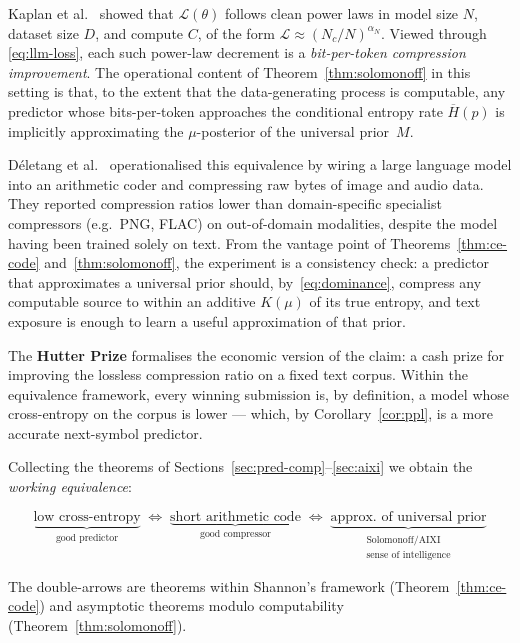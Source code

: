 Kaplan et al.\ \citep{kaplan2020scaling} showed that
$\mathcal{L}(\theta)$ follows clean power laws in model size $N$,
dataset size $D$, and compute $C$, of the form
$\mathcal{L} \approx (N_c / N)^{\alpha_N}$. Viewed through
\eqref{eq:llm-loss}, each such power-law decrement is a \emph{bit-per-token
compression improvement}. The operational content of
Theorem~\ref{thm:solomonoff} in this setting is that, to the extent
that the data-generating process is computable, any predictor whose
bits-per-token approaches the conditional entropy rate
$\overline{H}(p)$ is implicitly approximating the
$\mu$-posterior of the universal prior~$M$.

D\'{e}letang et al.\ \citep{deletang2024language} operationalised this
equivalence by wiring a large language model into an arithmetic coder
and compressing raw bytes of image and audio data. They reported
compression ratios lower than domain-specific specialist compressors
(e.g.\ PNG, FLAC) on out-of-domain modalities, despite the model
having been trained solely on text. From the vantage point of
Theorems~\ref{thm:ce-code} and~\ref{thm:solomonoff}, the experiment
is a consistency check: a predictor that approximates a universal
prior should, by~\eqref{eq:dominance}, compress any computable source
to within an additive $K(\mu)$ of its true entropy, and text exposure
is enough to learn a useful approximation of that prior.

The \textbf{Hutter Prize} \citep{hutter2005universal} formalises the
economic version of the claim: a cash prize for improving the
lossless compression ratio on a fixed text corpus. Within the
equivalence framework, every winning submission is, by definition,
a model whose cross-entropy on the corpus is lower --- which, by
Corollary~\ref{cor:ppl}, is a more accurate next-symbol predictor.

Collecting the theorems of
Sections~\ref{sec:pred-comp}--\ref{sec:aixi} we obtain the
\emph{working equivalence}:

\begin{equation}
  \underbrace{\text{low cross-entropy}}_{\text{good predictor}}
  \;\Longleftrightarrow\;
  \underbrace{\text{short arithmetic code}}_{\text{good compressor}}
  \;\Longleftrightarrow\;
  \underbrace{\text{approx.\ of universal prior}}_{\substack{\text{Solomonoff/AIXI}\\\text{sense of intelligence}}} \label{eq:chain}
\end{equation}

The double-arrows are theorems within Shannon's framework
(Theorem~\ref{thm:ce-code}) and asymptotic theorems modulo
computability (Theorem~\ref{thm:solomonoff}).

